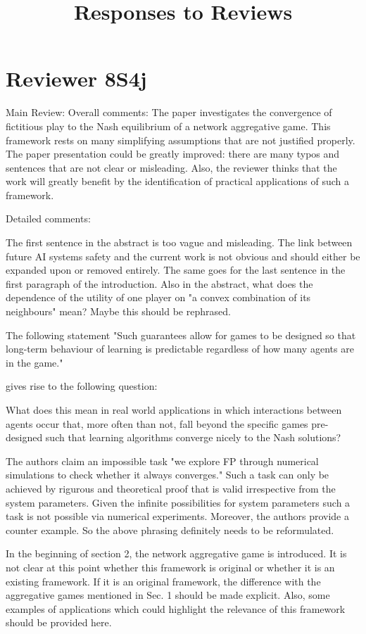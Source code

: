 \documentclass{article}
\title{Responses to Reviews}
\begin{document}
	\maketitle
	
	\section{Reviewer 8S4j}
	

	Main Review:
	Overall comments: The paper investigates the convergence of fictitious play to the Nash equilibrium of a network aggregative game. This framework rests on many simplifying assumptions that are not justified properly. The paper presentation could be greatly improved: there are many typos and sentences that are not clear or misleading. Also, the reviewer thinks that the work will greatly benefit by the identification of practical applications of such a framework.
	
	Detailed comments:
	
	The first sentence in the abstract is too vague and misleading. The link between future AI systems safety and the current work is not obvious and should either be expanded upon or removed entirely. The same goes for the last sentence in the first paragraph of the introduction.
	Also in the abstract, what does the dependence of the utility of one player on "a convex combination of its neighbours" mean? Maybe this should be rephrased.
	
	The following statement
	"Such guarantees allow for games to be designed so that long-term behaviour of learning is predictable regardless of how many agents are in the game."
	
	gives rise to the following question:
	
	What does this mean in real world applications in which interactions between agents occur that, more often than not, fall beyond the specific games pre-designed such that learning algorithms converge nicely to the Nash solutions?
	
	The authors claim an impossible task "we explore FP through numerical simulations to check whether it always converges." Such a task can only be achieved by rigurous and theoretical proof that is valid irrespective from the system parameters. Given the infinite possibilities for system parameters such a task is not possible via numerical experiments.
	Moreover, the authors provide a counter example. So the above phrasing definitely needs to be reformulated.
	
	In the beginning of section 2, the network aggregative game is introduced. It is not clear at this point whether this framework is original or whether it is an existing framework. If it is an original framework, the difference with the aggregative games mentioned in Sec. 1 should be made explicit.
	Also, some examples of applications which could highlight the relevance of this framework should be provided here.
	
\end{document}
